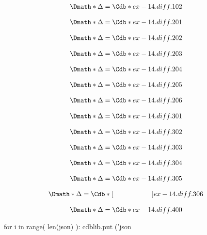 \documentclass[12pt]{cdblatex}
\begin{document}
\begin{dgroup*}
   \Dmath*{ \Delta = \Cdb*{ex-14.diff.102}}
\end{dgroup*}

\begin{dgroup*}
   \Dmath*{ \Delta = \Cdb*{ex-14.diff.201}}
\end{dgroup*}

\begin{dgroup*}
   \Dmath*{ \Delta = \Cdb*{ex-14.diff.202}}
\end{dgroup*}

\begin{dgroup*}
   \Dmath*{ \Delta = \Cdb*{ex-14.diff.203}}
\end{dgroup*}

\begin{dgroup*}
   \Dmath*{ \Delta = \Cdb*{ex-14.diff.204}}
\end{dgroup*}

\begin{dgroup*}
   \Dmath*{ \Delta = \Cdb*{ex-14.diff.205}}
\end{dgroup*}

\begin{dgroup*}
   \Dmath*{ \Delta = \Cdb*{ex-14.diff.206}}
\end{dgroup*}

\begin{dgroup*}
   \Dmath*{ \Delta = \Cdb*{ex-14.diff.301}}
\end{dgroup*}

\begin{dgroup*}
   \Dmath*{ \Delta = \Cdb*{ex-14.diff.302}}
\end{dgroup*}

\begin{dgroup*}
   \Dmath*{ \Delta = \Cdb*{ex-14.diff.303}}
\end{dgroup*}

\begin{dgroup*}
   \Dmath*{ \Delta = \Cdb*{ex-14.diff.304}}
\end{dgroup*}

\begin{dgroup*}
   \Dmath*{ \Delta = \Cdb*{ex-14.diff.305}}
\end{dgroup*}

\begin{dgroup*}
   \Dmath*{ \Delta = \Cdb*[\hskip2.0cm\hfill]{ex-14.diff.306}}
\end{dgroup*}

\begin{dgroup*}
   \Dmath*{ \Delta = \Cdb*{ex-14.diff.400}}
\end{dgroup*}

\clearpage


\bgroup
{}
\begin{cadabra}
   for i in range( len(json) ):
      cdblib.put ('json%
\end{cadabra}
\egroup
\end{document}
